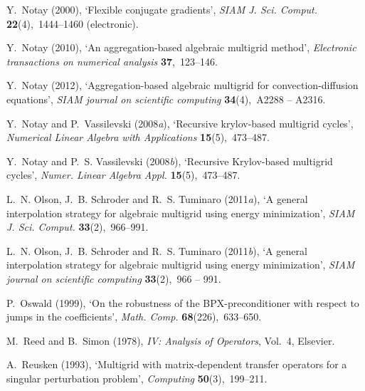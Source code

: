 \documentclass[12pt]{acta_2011xz}
\begin{document}
\begin{thebibliography}{xx}
Y.~Notay  (2000), `Flexible conjugate gradients', {\em SIAM J. Sci. Comput.}
  {\bf 22}(4),~1444--1460 (electronic).

Y.~Notay  (2010), `{An aggregation-based algebraic multigrid method}', {\em
  Electronic transactions on numerical analysis} {\bf 37},~123--146.

Y.~Notay  (2012), `{Aggregation-based algebraic multigrid for
  convection-diffusion equations}', {\em SIAM journal on scientific computing}
  {\bf 34}(4),~A2288 -- A2316.

Y.~Notay and P.~Vassilevski  (2008{\em a}), `Recursive krylov-based multigrid
  cycles', {\em Numerical Linear Algebra with Applications} {\bf
  15}(5),~473--487.

Y.~Notay and P.~S. Vassilevski  (2008{\em b}), `Recursive {K}rylov-based
  multigrid cycles', {\em Numer. Linear Algebra Appl.} {\bf 15}(5),~473--487.

L.~N. Olson, J.~B. Schroder and R.~S. Tuminaro  (2011{\em a}), `A general
  interpolation strategy for algebraic multigrid using energy minimization',
  {\em SIAM J. Sci. Comput.} {\bf 33}(2),~966--991.

L.~N. Olson, J.~B. Schroder and R.~S. Tuminaro  (2011{\em b}), `A general
  interpolation strategy for algebraic multigrid using energy minimization',
  {\em SIAM journal on scientific computing} {\bf 33}(2),~966 -- 991.

P.~Oswald  (1999), `On the robustness of the {BPX}-preconditioner with respect
  to jumps in the coefficients', {\em Math. Comp.} {\bf 68}(226),~633--650.

M.~Reed and B.~Simon  (1978), {\em IV: Analysis of Operators}, Vol.~4,
  Elsevier.

A.~Reusken  (1993), `Multigrid with matrix-dependent transfer operators for a
  singular perturbation problem', {\em Computing} {\bf 50}(3),~199--211.


\end{thebibliography}
\end{document}
